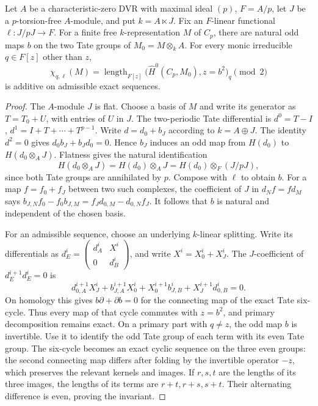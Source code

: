 \begin{lemma}
\label{C:cyclic_linear_Bockstein}
Let $A$ be a characteristic-zero DVR with maximal ideal $(p)$,
$F=A/p$, let $J$ be a $p$-torsion-free $A$-module, and put
$k=A\ltimes J$. Fix an $F$-linear functional $\ell:J/pJ\to F$.
For a finite free $k$-representation $M$ of $C_p$, there are natural
odd maps $b$ on the two Tate groups of $M_0=M\otimes_k A$.
For every monic irreducible $q\in F[z]$ other than $z$,
\[
 \chi_{q,\ell}(M)=
 \operatorname{length}_{F[z]}
   \bigl(\widehat H^0(C_p,M_0),z=b^2\bigr)_q\pmod2
\]
is additive on admissible exact sequences.
\end{lemma}
\begin{proof}
The $A$-module $J$ is flat. Choose a basis of $M$ and write its
generator as $T=T_0+U$, with entries of $U$ in $J$.
The two-periodic Tate differential is
$d^0=T-I$, $d^1=I+T+\cdots+T^{p-1}$.
Write $d=d_0+b_J$ according to $k=A\oplus J$.
The identity $d^2=0$ gives
$d_0b_J+b_Jd_0=0$. Hence $b_J$ induces an odd map from
$H(d_0)$ to $H(d_0\otimes_AJ)$.
Flatness gives the natural identification
\[
 H(d_0\otimes_AJ)=H(d_0)\otimes_AJ
              =H(d_0)\otimes_F(J/pJ),
\]
since both Tate groups are annihilated by $p$.
Compose with $\ell$ to obtain $b$.
For a map $f=f_0+f_J$ between two such complexes, the coefficient
of $J$ in $d_Nf=fd_M$ says
$b_{J,N}f_0-f_0b_{J,M}=f_Jd_{0,M}-d_{0,N}f_J$.
It follows that $b$ is natural and independent of the chosen basis.

For an admissible sequence, choose an underlying $k$-linear splitting.
Write its differentials as
$d_E^i=\left(\begin{smallmatrix}d_A^i&X^i\\0&d_B^i\end{smallmatrix}\right)$,
and write $X^i=X_0^i+X_J^i$.
The $J$-coefficient of $d_E^{i+1}d_E^i=0$ is
\[
 d_{0,A}^{i+1}X_J^i+b_{J,A}^{i+1}X_0^i
       +X_0^{i+1}b_{J,B}^i+X_J^{i+1}d_{0,B}^i=0.
\]
On homology this gives $b\partial+\partial b=0$ for the connecting
map of the exact Tate six-cycle. Thus every map of that cycle
commutes with $z=b^2$, and primary decomposition remains exact.
On a primary part with $q\ne z$, the odd map $b$ is invertible.
Use it to identify the odd Tate group of each term with its even
Tate group. The six-cycle becomes an exact cyclic sequence on the
three even groups: the second connecting map differs after folding
by the invertible operator $-z$, which preserves the relevant
kernels and images. If $r,s,t$ are the lengths of its three images,
the lengths of its terms are $r+t,r+s,s+t$. Their alternating
difference is even, proving the invariant.
\end{proof}

